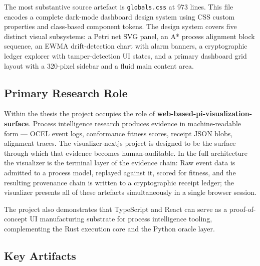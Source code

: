 The most substantive source artefact is \texttt{globals.css} at 973 lines. This file encodes a
complete dark-mode dashboard design system using CSS custom properties and class-based component
tokens. The design system covers five distinct visual subsystems: a Petri net SVG panel, an A{*}
process alignment block sequence, an EWMA drift-detection chart with alarm banners, a
cryptographic ledger explorer with tamper-detection UI states, and a primary dashboard grid
layout with a 320-pixel sidebar and a fluid main content area.

\subsection{Primary Research Role}
\label{sec:experiments-visualizer-nextjs-identity-role}

Within the thesis the project occupies the role of \textbf{web-based-pi-visualization-surface}.
Process intelligence research produces evidence in machine-readable form --- OCEL event logs,
conformance fitness scores, receipt JSON blobs, alignment traces. The visualizer-nextjs project
is designed to be the surface through which that evidence becomes human-auditable. In the full
architecture the visualizer is the terminal layer of the evidence chain: Raw event data is
admitted to a process model, replayed against it, scored for fitness, and the resulting
provenance chain is written to a cryptographic receipt ledger; the visualizer presents all of
these artefacts simultaneously in a single browser session.

The project also demonstrates that TypeScript and React can serve as a proof-of-concept UI
manufacturing substrate for process intelligence tooling, complementing the Rust execution core
and the Python oracle layer.

\subsection{Key Artifacts}
\label{sec:experiments-visualizer-nextjs-identity-artifacts}

